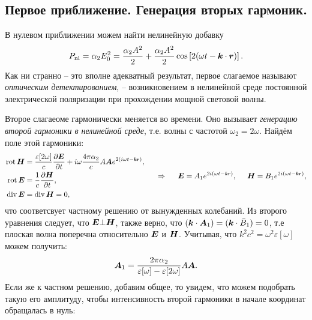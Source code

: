 \subsection{Первое приближение. Генерация вторых гармоник.}

В нулевом приближении можем найти нелинейную добавку
\begin{equation*}
    P_{\textnormal{nl}} = \alpha_2 E_0^2 = \frac{\alpha_2 A^2}{2} + \frac{\alpha_2 A^2}{2} \cos\left[2(\omega t - \mbox{\boldmath $k$} \cdot \mbox{\boldmath $r$})\right].
\end{equation*}
Как ни странно -- это вполне адекватный результат, первое слагаемое называют \textit{оптическим детектированием}, -- возникновением в нелинейной среде постоянной электрической поляризации при прохождении мощной световой волны. 

Второе слагаеоме гармонически меняется во времени. Оно вызывает \textit{генерацию второй гармоники в нелинейной среде}, т.е. волны с частотой $\omega_2 = 2 \omega$. Найдём поле этой гармоники:
\begin{equation*}
    \left.\begin{aligned}
        \rot \vc{H} &= \frac{\varepsilon[2\omega]}{c} \frac{\partial \vc{E}}{\partial t} + i \omega \frac{4 \pi \alpha_2}{c} A \vc{A} e^{2 (i \omega t - \smallvc{k} \smallvc{r})}, \\
        \rot \vc{E} &= \frac{1}{c}\frac{\partial \vc{H}}{\partial t}, \\
        \div \vc{E} &= \div \vc{H} = 0,
    \end{aligned}\right.
    \hspace{0.5cm} \Rightarrow \hspace{0.5cm}
    \vc{E} = A_1 e^{2 i (\omega t - \smallvc{k} \smallvc{r})},
    \hspace{5 mm} 
    \vc{H} = B_1 e^{2 i (\omega t - \smallvc{k} \smallvc{r})},
\end{equation*}
что соответсвует частному решению от вынужденных колебаний. Из второго уравнения следует, что $\mbox{\boldmath $E$} \bot \mbox{\boldmath $H$}$, также верно, что $(\mbox{\boldmath $k$} \cdot \mbox{\boldmath $A$}_1) = (\mbox{\boldmath $k$} \cdot \bar{B}_1)=0$, т.е плоская волна поперечна относительно $\mbox{\boldmath $E$}$ и $\mbox{\boldmath $H$}$. Учитывая, что $k^2 c^2 = \omega^2 \varepsilon[\omega]$ можем получить:
\begin{equation*}
    \mbox{\boldmath $A$}_1 = \frac{2 \pi \alpha_2}{\varepsilon[\omega]-\varepsilon[2\omega]} A \mbox{\boldmath $A$}.
\end{equation*}
Если же к частном решению, добавим общее, то увидем, что можем подобрать такую его амплитуду, чтобы интенсивность второй гармоники в начале координат обращалась в нуль:
